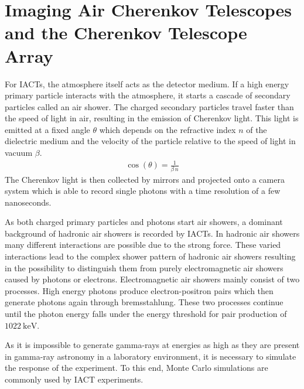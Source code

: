 \chapter{Imaging Air Cherenkov Telescopes and the Cherenkov Telescope Array}
\label{ch:cta}
For IACTs, the atmosphere itself acts as the detector medium. 
If a high energy primary particle interacts with the atmosphere, it starts a cascade of secondary particles called an air shower.
The charged secondary particles travel faster than the speed of light in air, resulting in the emission of Cherenkov light.
This light is emitted at a fixed angle $\theta$ which depends on the refractive index $n$ of the dielectric medium and the velocity of the particle 
relative to the speed of light in vacuum $\beta$.
\begin{align}
    \cos (\theta) = \frac{1}{\beta\, n} 
\end{align}
The Cherenkov light is then collected by mirrors and projected onto a camera system which is able to record single photons with a time resolution of a few nanoseconds.

As both charged primary particles and photons start air showers, a dominant background of hadronic air showers is recorded by IACTs.
In hadronic air showers many different interactions are possible due to the strong force.
These varied interactions lead to the complex shower pattern of hadronic air showers resulting in the possibility to distinguish them from purely electromagnetic
air showers caused by photons or electrons.
Electromagnetic air showers mainly consist of two processes. 
High energy photons produce electron-positron pairs which then generate photons again through bremsstahlung. 
These two processes continue until the photon energy falls under the energy threshold for pair production of $\SI{1022}{\kilo\electronvolt}$.

As it is impossible to generate gamma-rays at energies as high as they are present in gamma-ray astronomy in a laboratory environment, it is 
necessary to simulate the response of the experiment.
To this end, Monte Carlo simulations are commonly used by IACT experiments.


